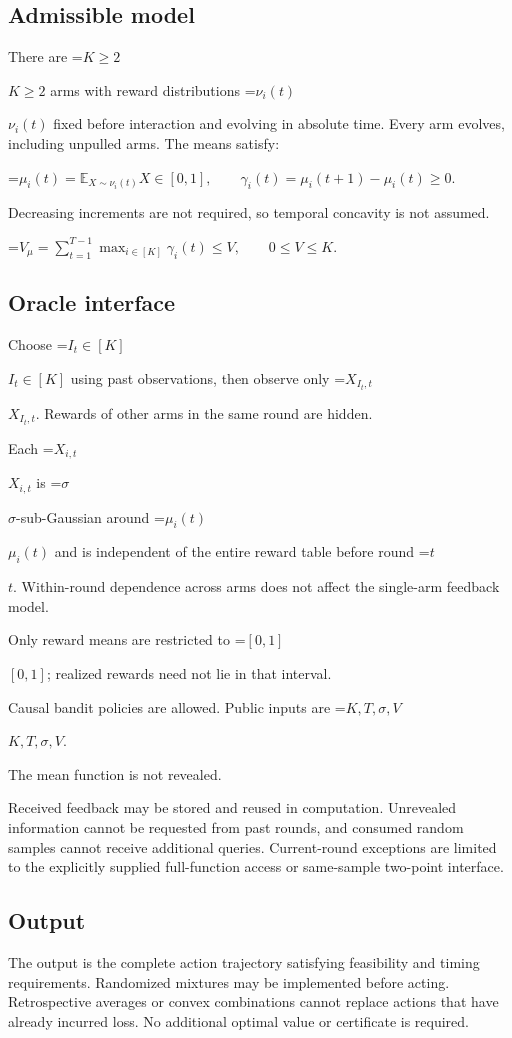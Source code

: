 \documentclass[10pt,a4paper]{article}
\newcommand{\AtlasMath}[1]{\par\begingroup\centering\setbox0=\hbox{$\displaystyle #1$}\ifdim\wd0>1.4\linewidth\typeout{ATLAS WIDE FORMULA: \the\wd0}\fi\ifdim\wd0>\linewidth\resizebox{\linewidth}{!}{\box0}\else\box0\fi\par\endgroup}
\newcommand{\AtlasInlineMath}[1]{\begingroup\setbox0=\hbox{$#1$}\ifdim\wd0>.4\linewidth\endgroup\AtlasMath{#1}\else\endgroup$#1$\fi}
\begin{document}
\subsection{Admissible model}
There are \AtlasInlineMath{K\ge2} arms with reward distributions \AtlasInlineMath{\nu_i(t)} fixed before interaction and evolving in absolute time. Every arm evolves, including unpulled arms. The means satisfy:


\AtlasMath{\mu_i(t)=\mathbb{E}_{X\sim\nu_i(t)}X\in[0,1],\qquad \gamma_i(t)=\mu_i(t+1)-\mu_i(t)\ge0.}


Decreasing increments are not required, so temporal concavity is not assumed.


\AtlasMath{V_\mu=\sum_{t=1}^{T-1}\max_{i\in[K]}\gamma_i(t)\le V,\qquad 0\le V\le K.}


\subsection{Oracle interface}
Choose \AtlasInlineMath{I_t\in[K]} using past observations, then observe only \AtlasInlineMath{X_{I_t,t}}. Rewards of other arms in the same round are hidden.

Each \AtlasInlineMath{X_{i,t}} is \AtlasInlineMath{\sigma}-sub-Gaussian around \AtlasInlineMath{\mu_i(t)} and is independent of the entire reward table before round \AtlasInlineMath{t}. Within-round dependence across arms does not affect the single-arm feedback model.

Only reward means are restricted to \AtlasInlineMath{[0,1]}; realized rewards need not lie in that interval.

Causal bandit policies are allowed. Public inputs are \AtlasInlineMath{K,T,\sigma,V}.

The mean function is not revealed.

Received feedback may be stored and reused in computation. Unrevealed information cannot be requested from past rounds, and consumed random samples cannot receive additional queries. Current-round exceptions are limited to the explicitly supplied full-function access or same-sample two-point interface.

\subsection{Output}
The output is the complete action trajectory satisfying feasibility and timing requirements. Randomized mixtures may be implemented before acting. Retrospective averages or convex combinations cannot replace actions that have already incurred loss. No additional optimal value or certificate is required.
\end{document}
